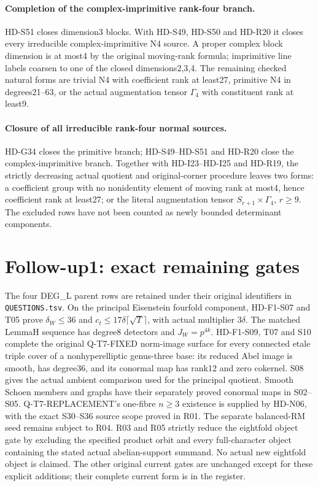 \paragraph{Completion of the complex-imprimitive rank-four branch.}
HD-S51 closes dimension3 blocks. With HD-S49, HD-S50 and
HD-R20 it closes every irreducible complex-imprimitive N4
source. A proper complex block dimension is at most4 by
the original moving-rank formula; imprimitive line labels
coarsen to one of the closed dimensions2,3,4. The remaining
checked natural forms are trivial N4 with coefficient rank
at least27, primitive N4 in degrees21--63, or the actual
augmentation tensor \(\Gamma_4\) with constituent rank at least9.


\paragraph{Closure of all irreducible rank-four normal sources.}
HD-G34 closes the primitive branch; HD-S49--HD-S51 and
HD-R20 close the complex-imprimitive branch. Together with
HD-I23--HD-I25 and HD-R19, the strictly decreasing actual
quotient and original-corner procedure leaves two forms:
a coefficient group with no nonidentity element of moving
rank at most4, hence coefficient rank at least27; or the
literal augmentation tensor \(S_{r+1}\times\Gamma_4\),
\(r\ge9\). The excluded rows have not been counted as
newly bounded determinant components.

\section{Follow-up1: exact remaining gates}
The four DEG\_L parent rows are retained under their original identifiers in
\texttt{QUESTIONS.tsv}. On the principal Eisenstein fourfold component,
HD-F1-S07 and T05 prove $\delta_W\le36$ and
$c_t\le17\delta\lceil\sqrt T\rceil$, with actual multiplier $3\delta$.
The matched LemmaH sequence has degree8 detectors and $J_W=p^{4k}$.
HD-F1-S09, T07 and S10 complete the original Q-T7-FIXED norm-image
surface for every connected etale triple cover of a nonhyperelliptic
genus-three base: its reduced Abel image is smooth, has degree36,
and its conormal map has rank12 and zero cokernel. S08 gives the
actual ambient comparison used for the principal quotient. Smooth Schoen members and
graphs have their separately proved conormal maps in S02--S05.
Q-T7-REPLACEMENT's one-fibre $n\ge3$ existence is supplied by HD-N06,
with the exact S30--S36 source scope proved in R01. The separate
balanced-RM seed remains subject to R04. R03 and R05 strictly reduce
the eightfold object gate by excluding the specified product orbit
and every full-character object containing the stated actual
abelian-support summand. No actual new eightfold object is claimed.
The other original current gates are unchanged except for these
explicit additions; their complete current form is in the register.


